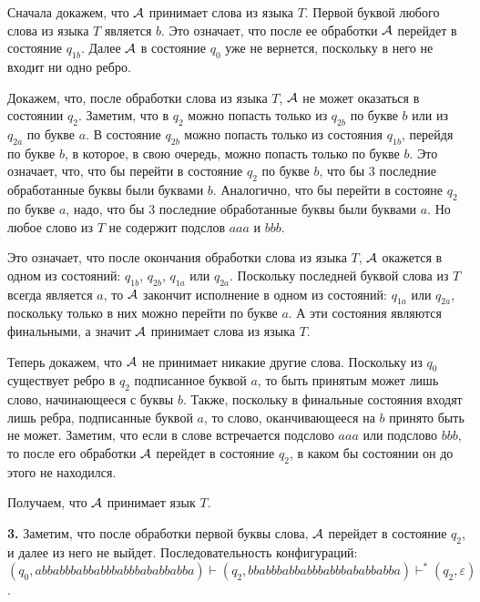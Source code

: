 \documentclass[10pt]{article}
\let\eps\varepsilon
\begin{document}
Сначала докажем, что ${\cal A}$ принимает слова из языка $T$. Первой буквой любого слова из языка $T$ является $b$. Это означает, что после ее обработки ${\cal A}$ перейдет в состояние $q_{1b}$. Далее ${\cal A}$ в состояние $q_0$ уже не вернется, поскольку в него не входит ни одно ребро.

Докажем, что, после обработки слова из языка $T$, ${\cal A}$ не может оказаться в состоянии $q_2$. Заметим, что в $q_2$ можно попасть только из $q_{2b}$ по букве $b$ или из $q_{2a}$ по букве $a$. В состояние $q_{2b}$ можно попасть только из состояния $q_{1b}$, перейдя по букве $b$, в которое, в свою очередь, можно попасть только по букве $b$. Это означает, что, что бы перейти в состояние $q_2$ по букве $b$, что бы $3$ последние обработанные буквы были буквами $b$. Аналогично, что бы перейти в состояне $q_2$ по букве $a$, надо, что бы $3$ последние обработанные буквы были буквами $a$. Но любое слово из $T$ не содержит подслов $aaa$ и $bbb$. 

Это означает, что после окончания обработки слова из языка $T$, ${\cal A}$ окажется в одном из состояний: $q_{1b}$, $q_{2b}$, $q_{1a}$ или $q_{2a}$. Поскольку последней буквой слова из $T$ всегда является $a$, то ${\cal A}$ закончит исполнение в одном из состояний: $q_{1a}$ или $q_{2a}$, поскольку только в них можно перейти по букве $a$. А эти состояния являются финальными, а значит ${\cal A}$ принимает слова из языка $T$.

Теперь докажем, что ${\cal A}$ не принимает никакие другие слова. Поскольку из $q_0$ существует ребро в $q_2$ подписанное буквой $a$, то быть принятым может лишь слово, начинающееся с буквы $b$. Также, поскольку в финальные состояния входят лишь ребра, подписанные буквой $a$, то слово, оканчивающееся на $b$ принято быть не может. Заметим, что если в слове встречается подслово $aaa$ или подслово $bbb$, то после его обработки ${\cal A}$ перейдет в состояние $q_2$, в каком бы состоянии он до этого не находился.

Получаем, что ${\cal A}$ принимает язык $T$.

{\bf 3.}
Заметим, что после обработки первой буквы слова, ${\cal A}$ перейдет в состояние $q_2$, и далее из него не выйдет. Последовательность конфигураций: $(q_0, abbabbbabbabbbabbbababbabba) \vdash (q_2, bbabbbabbabbbabbbababbabba) \vdash^* (q_2, \eps)$.
\end{document}
